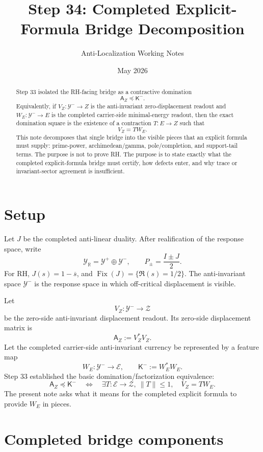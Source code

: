 \documentclass[11pt]{article}
\title{Step 34: Completed Explicit-Formula Bridge Decomposition}
\author{Anti-Localization Working Notes}
\date{May 2026}
\newcommand{\K}{\mathsf K}
\newcommand{\A}{\mathsf A}
\newcommand{\Y}{\mathcal Y}
\newcommand{\Fix}{\operatorname{Fix}}
\begin{document}
\maketitle

\begin{abstract}
Step 33 isolated the RH-facing bridge as a contractive domination
\[
  \A_Z \preceq \K^-.
\]
Equivalently, if \(V_Z:\Y^-\to Z\) is the anti-invariant zero-displacement readout and \(W_E:\Y^-\to E\) is the completed carrier-side minimal-energy readout, then the exact domination square is the existence of a contraction \(T:E\to Z\) such that
\[
  V_Z=T W_E.
\]
This note decomposes that single bridge into the visible pieces that an explicit formula must supply: prime-power, archimedean/gamma, pole/completion, and support-tail terms. The purpose is not to prove RH. The purpose is to state exactly what the completed explicit-formula bridge must certify, how defects enter, and why trace or invariant-sector agreement is insufficient.
\end{abstract}

\section{Setup}

Let \(J\) be the completed anti-linear duality. After realification of the response space, write
\[
  \Y_{\mathbb R}=\Y^+\oplus \Y^-,
  \qquad
  P_\pm=\frac{I\pm J}{2}.
\]
For RH, \(J(s)=1-\overline{s}\), and \(\Fix(J)=\{\Re(s)=1/2\}\). The anti-invariant space \(\Y^-\) is the response space in which off-critical displacement is visible.

Let
\[
  V_Z:\Y^-\to \mathcal Z
\]
be the zero-side anti-invariant displacement readout. Its zero-side displacement matrix is
\[
  \A_Z:=V_Z^*V_Z.
\]
Let the completed carrier-side anti-invariant currency be represented by a feature map
\[
  W_E:\Y^-\to \mathcal E,
  \qquad
  \K^-:=W_E^*W_E.
\]
Step 33 established the basic domination/factorization equivalence:
\[
  \A_Z\preceq \K^-
  \quad\Longleftrightarrow\quad
  \exists T:\mathcal E\to\mathcal Z,\ \|T\|\le 1,
  \quad V_Z=T W_E.
\]
The present note asks what it means for the completed explicit formula to provide \(W_E\) in pieces.

\section{Completed bridge components}
\end{document}
